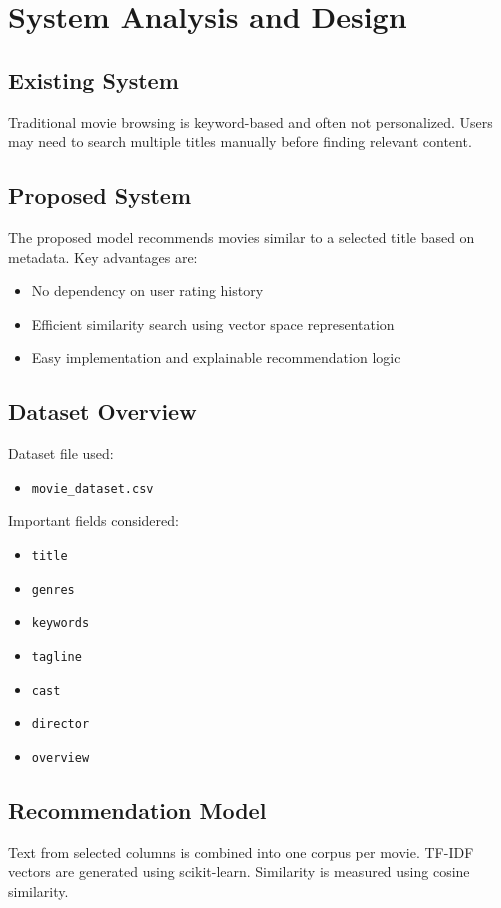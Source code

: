 \documentclass[12pt,a4paper]{report}
\begin{document}
\chapter{System Analysis and Design}

\section{Existing System}
Traditional movie browsing is keyword-based and often not personalized. Users may
need to search multiple titles manually before finding relevant content.

\section{Proposed System}
The proposed model recommends movies similar to a selected title based on metadata.
Key advantages are:
\begin{itemize}[leftmargin=1.2cm]
\item No dependency on user rating history
\item Efficient similarity search using vector space representation
\item Easy implementation and explainable recommendation logic
\end{itemize}

\section{Dataset Overview}
Dataset file used:
\begin{itemize}[leftmargin=1.2cm]
\item \texttt{movie\_dataset.csv}
\end{itemize}

Important fields considered:
\begin{itemize}[leftmargin=1.2cm]
\item \texttt{title}
\item \texttt{genres}
\item \texttt{keywords}
\item \texttt{tagline}
\item \texttt{cast}
\item \texttt{director}
\item \texttt{overview}
\end{itemize}

\section{Recommendation Model}
Text from selected columns is combined into one corpus per movie.
TF-IDF vectors are generated using scikit-learn. Similarity is measured using
cosine similarity.
\end{document}
